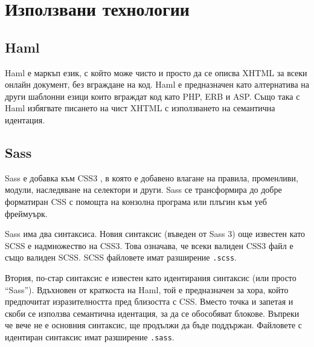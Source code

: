 \documentclass[a4paper]{article}
\begin{document}
\section{Използвани технологии}

  \subsection{Haml}
  Haml е \cite{haml} маркъп език, с който може чисто и просто да се описва XHTML за всеки онлайн документ, без вграждане на код. Haml е предназначен като алтернатива на други шаблонни езици които вграждат код като PHP, ERB и ASP. Също така с Haml избягвате писането на чист XHTML с използването на семантична идентация.

  \subsection{Sass}
  Sass \cite{sass} е добавка към CSS3 \cite{css}, в която е добавено влагане на правила, променливи, модули, наследяване на селектори и други. Sass се трансформира до добре форматиран CSS с помощта на конзолна програма или плъгин към уеб фреймуърк.

  Sass има два синтаксиса. Новия синтаксис (въведен от Sass 3) още известен като SCSS е надмножество на CSS3. Това означава, че всеки валиден CSS3 файл е също валиден SCSS. SCSS файловете имат разширение \texttt{.scss}.


  Втория, по-стар синтаксис е известен като идентирания синтаксис (или просто ``Sass''). Вдъхновен от краткоста на Haml, той е предназначен за хора, който предпочитат изразителността пред близостта с CSS. Вместо точка и запетая и скоби се използва семантична идентация, за да се обособяват блокове. Въпреки че вече не е основния синтаксис, ще продължи да бъде поддържан. Файловете с идентиран синтаксис имат разширение \texttt{.sass}.
\end{document}
